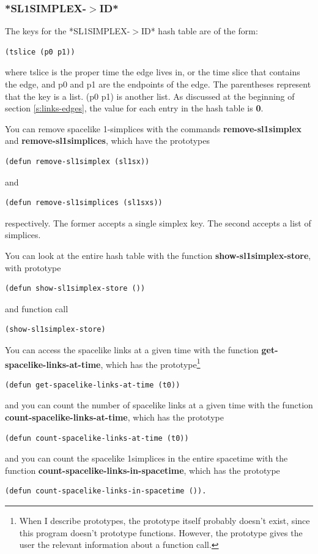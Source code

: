 \documentclass[12pt]{article}
\begin{document}
\subsubsection{*SL1SIMPLEX-$>$ID*}
\label{sss:sl1simplex:id}
The keys for the *SL1SIMPLEX-$>$ID* hash table are of the form:
\begin{lstlisting}
(tslice (p0 p1))
\end{lstlisting}
where tslice is the proper time the edge lives in, or the time slice
that contains the edge, and p0 and p1 are the endpoints of the
edge. The parentheses represent that the key is a list. (p0 p1) is
another list. As discussed at the beginning of section
\ref{s:links-edges}, the value for each entry in the hash table is
\textbf{0}.

You can remove spacelike 1-simplices with the commands
\textbf{remove-sl1simplex} and \textbf{remove-sl1simplices}, which
have the prototypes
\begin{lstlisting}
(defun remove-sl1simplex (sl1sx))
\end{lstlisting}
and 
\begin{lstlisting}
(defun remove-sl1simplices (sl1sxs))
\end{lstlisting}
respectively. The former accepts a single simplex key. The second
accepts a list of simplices.

You can look at the entire hash table with the function
\textbf{show-sl1simplex-store}, with prototype
\begin{lstlisting}
(defun show-sl1simplex-store ())
\end{lstlisting}
and function call
\begin{lstlisting}
(show-sl1simplex-store)
\end{lstlisting}

You can access the spacelike links at a given time with the function
\textbf{get-spacelike-links-at-time}, which has the
prototype\footnote{When I describe prototypes, the prototype itself
  probably doesn't exist, since this program doesn't prototype
  functions. However, the prototype gives the user the relevant
  information about a function call.}
\begin{lstlisting}
(defun get-spacelike-links-at-time (t0))
\end{lstlisting}
and you can count the number of spacelike links at a given time with
the function \textbf{count-spacelike-links-at-time}, which has the
prototype
\begin{lstlisting}
(defun count-spacelike-links-at-time (t0))
\end{lstlisting}
and you can count the spacelike 1simplices in the entire spacetime
with the function \textbf{count-spacelike-links-in-spacetime}, which
has the prototype
\begin{lstlisting}
(defun count-spacelike-links-in-spacetime ()).
\end{lstlisting}
\end{document}
